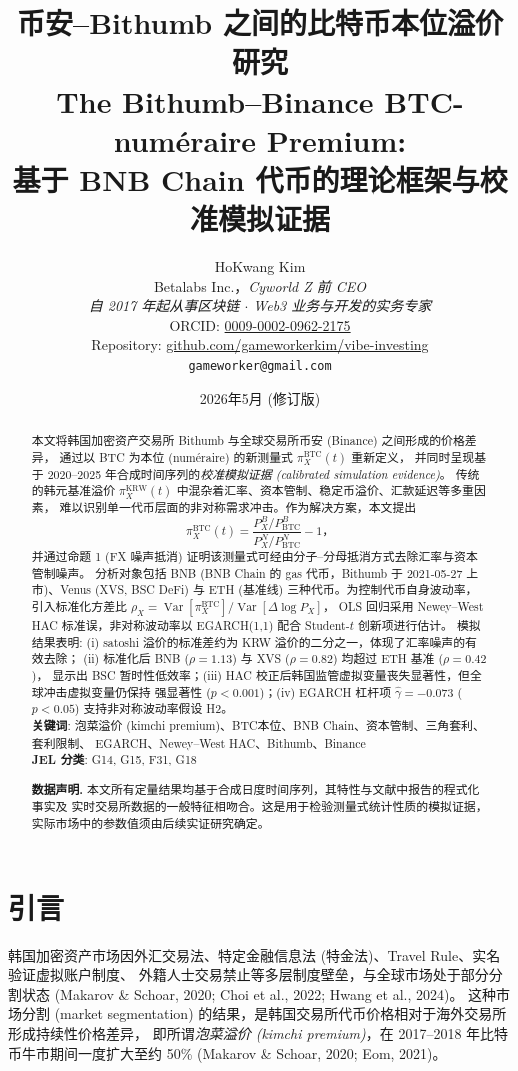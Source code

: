 \documentclass[11pt,a4paper]{article}
\title{\textbf{币安--Bithumb 之间的比特币本位溢价研究\\[6pt]
       \large The Bithumb--Binance BTC-num\'eraire Premium:\\
       基于 BNB Chain 代币的理论框架与校准模拟证据}}
\author{HoKwang Kim\\
        \small Betalabs Inc.，\emph{Cyworld Z 前 CEO}\\
        \small \emph{自 2017 年起从事区块链 \(\cdot\) Web3 业务与开发的实务专家}\\
        \small ORCID: \href{https://orcid.org/0009-0002-0962-2175}{0009-0002-0962-2175}\\
        \small Repository: \href{https://github.com/gameworkerkim/vibe-investing}{github.com/gameworkerkim/vibe-investing}\\
        \small \texttt{gameworker@gmail.com}}
\date{2026年5月 (修订版)}
\begin{document}
\maketitle

\begin{abstract}
\noindent 本文将韩国加密资产交易所 Bithumb 与全球交易所币安 (Binance) 之间形成的价格差异，
通过以 BTC 为本位 (num\'eraire) 的新测量式 $\pi^{\text{BTC}}_X(t)$ 重新定义，
并同时呈现基于 2020--2025 年合成时间序列的\emph{校准模拟证据 (calibrated simulation evidence)}。
传统的韩元基准溢价 $\pi^{\text{KRW}}_X(t)$ 中混杂着汇率、资本管制、稳定币溢价、汇款延迟等多重因素，
难以识别单一代币层面的非对称需求冲击。作为解决方案，本文提出
\[
   \pi^{\text{BTC}}_X(t)=\frac{P_X^B/P_{\mathrm{BTC}}^B}{P_X^N/P_{\mathrm{BTC}}^N}-1，
\]
并通过命题 1 (FX 噪声抵消) 证明该测量式可经由分子--分母抵消方式去除汇率与资本管制噪声。
分析对象包括 BNB (BNB Chain 的 gas 代币，Bithumb 于 2021-05-27 上市)、Venus (XVS, BSC DeFi) 与
ETH (基准线) 三种代币。为控制代币自身波动率，引入标准化方差比
$\rho_X=\operatorname{Var}[\pi^{\text{BTC}}_X]/\operatorname{Var}[\Delta\log P_X]$，
OLS 回归采用 Newey--West HAC 标准误，非对称波动率以 EGARCH(1,1) 配合 Student-$t$ 创新项进行估计。
模拟结果表明: (i) satoshi 溢价的标准差约为 KRW 溢价的二分之一，体现了汇率噪声的有效去除；
(ii) 标准化后 BNB ($\rho=1.13$) 与 XVS ($\rho=0.82$) 均超过 ETH 基准 ($\rho=0.42$)，
显示出 BSC 暂时性低效率；(iii) HAC 校正后韩国监管虚拟变量丧失显著性，但全球冲击虚拟变量仍保持
强显著性 ($p<0.001$)；(iv) EGARCH 杠杆项 $\hat\gamma=-0.073$ ($p<0.05$) 支持非对称波动率假设 H2。
\\[4pt]
\textbf{关键词}: 泡菜溢价 (kimchi premium)、BTC本位、BNB Chain、资本管制、三角套利、套利限制、
EGARCH、Newey--West HAC、Bithumb、Binance\\
\textbf{JEL 分类}: G14, G15, F31, G18

\medskip
\noindent\textbf{数据声明.} 本文所有定量结果均基于合成日度时间序列，其特性与文献中报告的程式化事实及
实时交易所数据的一般特征相吻合。这是用于检验测量式统计性质的模拟证据，
实际市场中的参数值须由后续实证研究确定。
\end{abstract}

\section{引言}

韩国加密资产市场因外汇交易法、特定金融信息法 (特金法)、Travel Rule、实名验证虚拟账户制度、
外籍人士交易禁止等多层制度壁垒，与全球市场处于部分分割状态
(Makarov \& Schoar, 2020; Choi et al., 2022; Hwang et al., 2024)。
这种市场分割 (market segmentation) 的结果，是韩国交易所代币价格相对于海外交易所形成持续性价格差异，
即所谓\emph{泡菜溢价 (kimchi premium)}，在 2017--2018 年比特币牛市期间一度扩大至约 50\%
(Makarov \& Schoar, 2020; Eom, 2021)。
\end{document}
